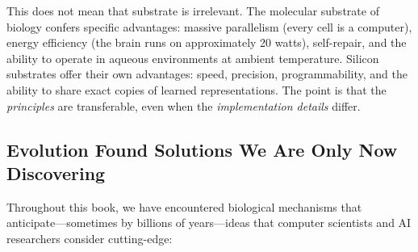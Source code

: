 This does not mean that substrate is irrelevant. The molecular substrate of biology confers specific advantages: massive parallelism (every cell is a computer), energy efficiency (the brain runs on approximately 20 watts), self-repair, and the ability to operate in aqueous environments at ambient temperature. Silicon substrates offer their own advantages: speed, precision, programmability, and the ability to share exact copies of learned representations. The point is that the \emph{principles} are transferable, even when the \emph{implementation details} differ.

\subsection{Evolution Found Solutions We Are Only Now Discovering}

Throughout this book, we have encountered biological mechanisms that anticipate---sometimes by billions of years---ideas that computer scientists and AI researchers consider cutting-edge:

